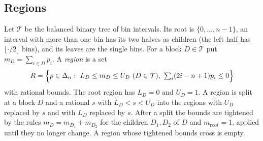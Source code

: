 \documentclass[11pt]{amsart}
\theoremstyle{definition}
\theoremstyle{remark}
\numberwithin{equation}{section}
\begin{document}
\subsection{Regions} Let $\mathcal{T}$ be the balanced binary tree of bin intervals. Its root is $\{0,\dots,n-1\}$, an interval with more than one bin has its two halves as children (the left half has $\lfloor\cdot/2\rfloor$ bins), and its leaves are the single bins. For a block $D\in\mathcal{T}$ put $m_D=\sum_{i\in D}p_i$. A \emph{region} is a set
\[
R=\Bigl\{p\in\Delta_n:\ L_D\le m_D\le U_D\ (D\in\mathcal{T}),\ \textstyle\sum_i(2i-n+1)p_i\le0\Bigr\}
\]
with rational bounds. The root region has $L_D=0$ and $U_D=1$. A region is split at a block $D$ and a rational $s$ with $L_D<s<U_D$ into the regions with $U_D$ replaced by $s$ and with $L_D$ replaced by $s$. After a split the bounds are tightened by the rules $m_D=m_{D_1}+m_{D_2}$ for the children $D_1,D_2$ of $D$ and $m_{\mathrm{root}}=1$, applied until they no longer change. A region whose tightened bounds cross is empty.
\end{document}
